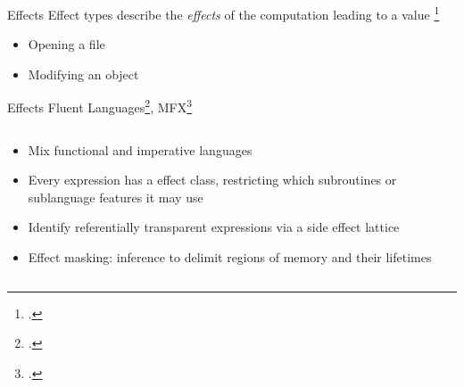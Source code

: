 \documentclass[aspectratio=169]{beamer}
\begin{document}
\begin{frame}{Effects}
    Effect types describe the \emph{effects} of the computation leading to a value \footcite{pierce_advanced_2005}
    \\
    \begin{itemize}
        \item Opening a file
        \item Modifying an object
    \end{itemize}
\end{frame}

\begin{frame}{Effects}
    Fluent Languages\footcite{gifford_integrating_1986}, MFX\footcite{lucassen_polymorphic_1988}
  \begin{columns}[T]
    \begin{column}{0.68\textwidth}
        \begin{itemize}[<+->]
            \item Mix functional and imperative languages 
            \item Every expression has a \alert{effect class}, restricting which subroutines or sublanguage features it may use
            \item Identify \alert{referentially transparent} expressions via a side effect lattice 
            \item Effect masking: inference to delimit regions of memory and their lifetimes 
        \end{itemize}
    \end{column}

    \pause

    \begin{column}{0.30\textwidth}
    \vspace{-0.2in}
    \footnotesize{

}
\end{column}
\end{columns}
\end{frame}
\end{document}

